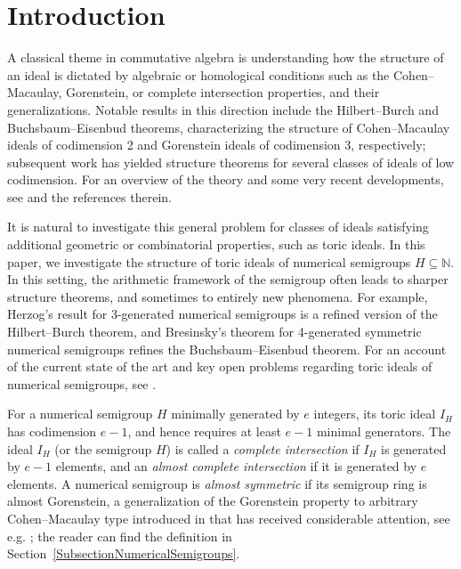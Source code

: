 \documentclass[11pt,twoside]{amsart}
\theoremstyle{definition}
\numberwithin{equation}{section}
\begin{document}
\maketitle


\section{Introduction}

A classical theme in commutative algebra is understanding how  the structure of an ideal 
is dictated by algebraic or homological conditions such as the Cohen--Macaulay, Gorenstein, or complete intersection properties, and their generalizations.
Notable results in this direction include the Hilbert--Burch \cite{Burch}
and Buchsbaum--Eisenbud \cite{BE} theorems, characterizing the structure of Cohen–Macaulay ideals of codimension 2 and Gorenstein ideals of codimension 3, respectively; subsequent work has yielded structure theorems for several classes of ideals of low codimension.
For an overview of the theory and some very recent developments, 
see \cite{CGNW,GCNW} and the references therein.


It is  natural to investigate this general problem for classes of ideals satisfying additional geometric or combinatorial properties,
such as   toric ideals.
In this paper, we investigate the structure of toric ideals of numerical semigroups $H \subseteq \mathbb{N}$.
In this setting, the  arithmetic framework of the semigroup often leads to sharper structure theorems, and sometimes to entirely new phenomena.
For example, 
Herzog's result for 3-generated  numerical semigroups  \cite{H} is a refined 
version of the Hilbert--Burch theorem, 
and Bresinsky's theorem for 4-generated symmetric numerical semigroups \cite{B75}
refines the Buchsbaum--Eisenbud theorem.
For an account of the current state of the art and key open problems regarding toric ideals of numerical semigroups, see \cite{MS}.

For a numerical semigroup $H $ minimally generated by $e$ integers, 
its toric ideal $I_H$ has codimension $e-1$, and hence requires at least $e-1$ minimal generators.
The ideal $I_H$ (or the semigroup $H$) is called a \emph{complete intersection} if $I_H$ is generated by $e-1$ elements, and  an \emph{almost complete intersection} if it is generated by  $e$ elements.
A numerical semigroup is \emph{almost symmetric} if its semigroup ring is almost Gorenstein, a generalization of the Gorenstein property to arbitrary Cohen--Macaulay type introduced in \cite{BF} that has received considerable attention,
see e.g. \cite{E,GTT,HW,N};
the reader can find the  definition in Section~\ref{SubsectionNumericalSemigroups}.
\end{document}
